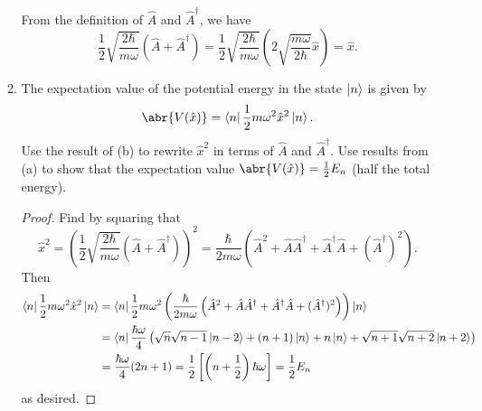 \documentclass[11pt]{article}
\newcommand{\br}[1]{\left(#1\right)}
\newcommand{\sbr}[1]{\left[#1\right]}
\begin{document}
\begin{enumerate}[label=27.\arabic*]
\begin{enumerate}[label=(\alph*)]
        From the definition of $\hat{A}$ and $\hat{A}^{\dagger}$, we have \[\frac{1}{2}\sqrt{\frac{2\hbar}{m\omega}}\br{\hat{A} + \hat{A}^{\dagger}} = \frac{1}{2}\sqrt{\frac{2\hbar}{m\omega}}\br{2\sqrt{\frac{m\omega}{2\hbar}}\hat{x}} = \hat{x}.\]
        \item The expectation value of the potential energy in the state $\ket{n}$ is given by \[\abr{V(\hat{x})} = \bra{n}\frac{1}{2}m\omega^2\hat{x}^2\ket{n}.\] Use the result of (b) to rewrite $\hat{x}^2$ in terms of $\hat{A}$ and $\hat{A}^{\dagger}$. Use results from (a) to show that the expectation value $\abr{V(\hat{x})} = \frac{1}{2}E_n$ (half the total energy).
        \begin{proof}
            Find by squaring that \[\hat{x}^2 = \br{\frac{1}{2}\sqrt{\frac{2\hbar}{m\omega}}\br{\hat{A} + \hat{A}^{\dagger}}}^2 = \frac{\hbar}{2m\omega} \br{\hat{A}^2 + \hat{A}\hat{A}^{\dagger} + \hat{A}^{\dagger}\hat{A} + (\hat{A}^{\dagger})^2}.\] Then \begin{align*}
                \bra{n}\frac{1}{2}m\omega^2\hat{x}^2\ket{n} &= \bra{n}\frac{1}{2}m\omega^2\br{\frac{\hbar}{2m\omega} \br{\hat{A}^2 + \hat{A}\hat{A}^{\dagger} + \hat{A}^{\dagger}\hat{A} + (\hat{A}^{\dagger})^2}}\ket{n}\\
                &= \bra{n}\frac{\hbar\omega}{4}\br{\sqrt{n}\sqrt{n-1}\ket{n-2} + (n+1)\ket{n} + n\ket{n} + \sqrt{n+1}\sqrt{n+2}\ket{n+2}}\\
                &= \frac{\hbar\omega}{4}(2n+1) = \frac{1}{2}\sbr{\br{n+\frac{1}{2}}\hbar\omega} = \frac{1}{2}E_n
            \end{align*} as desired.
        \end{proof}
    \end{enumerate}
\end{enumerate}
\end{document}
